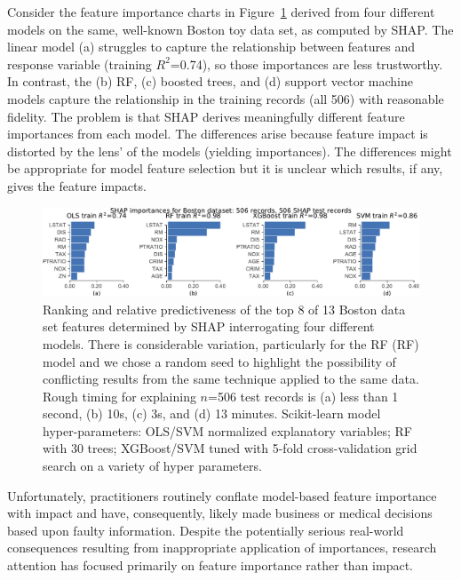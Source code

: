 \documentclass[11pt]{article}
\newcommand{\figref}[1]{Figure~\ref{#1}}
\newcommand{\todo}[1]{{{\small\color{red}{[#1]}}}}
\begin{document}
Consider the feature importance charts in \figref{fig:diff-models} derived from four different models on the same, well-known Boston toy data set, as computed by SHAP. The linear model (a) struggles to capture the relationship between features and response variable (training $R^2$=0.74), so those importances are less trustworthy.  In contrast, the (b) RF, (c) boosted trees, and (d) support vector machine models capture the relationship in the training records (all 506) with reasonable fidelity. The problem is that SHAP derives meaningfully different feature importances from each model. The differences arise because feature impact is distorted by the lens' of the models (yielding importances). The differences might be appropriate for model feature selection but it is unclear which results, if any, gives the feature impacts. 

\begin{figure}[htbp]
\begin{center}
\includegraphics[scale=0.6]{images/diff-models.pdf}
\caption{\small Ranking and relative predictiveness of the top 8 of 13 Boston data set features determined by SHAP interrogating four different models.  There is considerable variation, particularly for the RF (RF) model and we chose a random seed to highlight the possibility of conflicting results from the same technique applied to the same data. Rough timing for explaining $n$=506 test records is (a) less than 1 second, (b) 10s, (c) 3s, and (d) 13 minutes.  Scikit-learn model hyper-parameters: OLS/SVM normalized explanatory variables; RF with 30 trees; XGBoost/SVM tuned with 5-fold cross-validation grid search on a variety of hyper parameters. \todo{SHAP time for 506 test records using SVR = 753.6s, 506/506 [12:33<00:00,  1.49s/it]. training score only since very small, gives idea of capture relationship. shap explains entire training set for full resolution.}}
\label{fig:diff-models}
\end{center}
\end{figure}

Unfortunately, practitioners routinely conflate model-based feature importance with impact and have, consequently, likely made business or medical decisions based upon faulty information. Despite the potentially serious real-world consequences resulting from inappropriate application of importances, research attention has focused primarily on feature importance rather than impact. 
\end{document}

